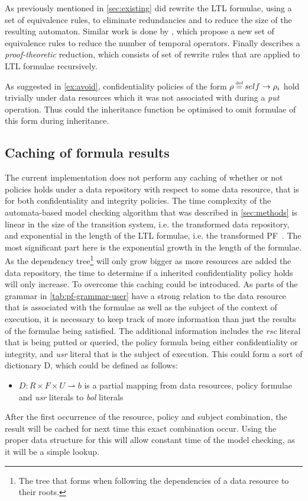 As previously mentioned in \autoref{sec:existing} did \cite{somenzi2000efficient} rewrite the LTL formulae, using a set of equivalence rules, to eliminate redundancies and to reduce the size of the resulting automaton. Similar work is done by \cite{babiak2012ltl}, which propose a new set of equivalence rules to reduce the number of temporal operators. Finally \cite{etessami2000optimizing} describes a \emph{proof-theoretic} reduction, which consists of set of rewrite rules that are applied to LTL formulae recursively.

As suggested in \autoref{ex:avoid}, confidentiality policies of the form $\conf \eqdef self \imply \conf_i$ hold trivially under data resources which it was not associated with during a \emph{put} operation. Thus could the inheritance function be optimised to omit formulae of this form during inheritance.

\subsection{Caching of formula results}\label{sec:cache}
The current implementation does not perform any caching of whether or not policies holds under a data repository with respect to some data resource, that is for both confidentiality and integrity policies. The time complexity of the automata-based model checking algorithm that was described in \autoref{sec:methods} is linear in the size of the transition system, i.e. the transformed data repository, and exponential in the length of the LTL formulae, i.e. the transformed PF~\cite{baier2008principles}. The most significant part here is the exponential growth in the length of the formulae. As the dependency tree\footnote{The tree that forms when following the dependencies of a data resource to their roots.} will only grow bigger as more resources are added the data repository, the time to determine if a inherited confidentiality policy holds will only increase. To overcome this caching could be introduced. As parts of the grammar in \autoref{tab:pf-grammar-user} have a strong relation to the data resource that is associated with the formulae as well as the subject of the context of execution, it is necessary to keep track of more information than just the results of the formulae being satisfied. The additional information includes the \emph{rsc} literal that is being putted or queried, the policy formula being either confidentiality or integrity, and \emph{usr} literal that is the subject of execution. This could form a sort of dictionary D, which could be defined as follows:
\begin{itemize}
    \item $D : R \times F \times U \rightharpoonup b$ is a partial mapping from data resources, policy formulae and \emph{usr} literals to \emph{bol} literals
\end{itemize}
After the first occurrence of the resource, policy and subject combination, the result will be cached for next time this exact combination occur. Using the proper data structure for this will allow constant time of the model checking, as it will be a simple lookup.